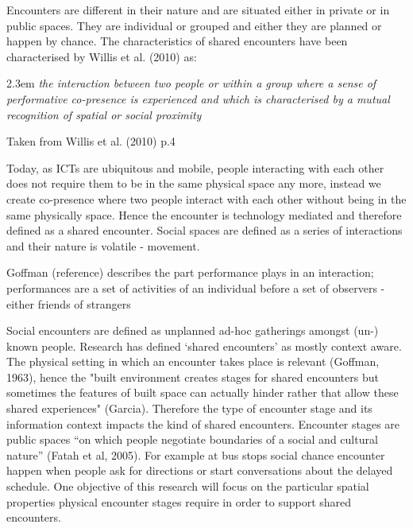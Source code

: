 Encounters are different in their nature and are situated either in private or in public spaces. They are individual or grouped and either they are planned or happen by chance. The characteristics of shared encounters have been characterised by Willis et al. (2010) as:


\begin{singlespace}
	\leftskip2.3em
		\rightskip\leftskip
\textit{\small the interaction between two people or within a group where a sense of performative co-presence is experienced and which is characterised by a mutual recognition of spatial or social proximity} 

\small Taken from  Willis et al. (2010) p.4
\end{singlespace}

Today, as ICTs are ubiquitous and mobile, people interacting with each other does not require them to be in the same physical space any more, instead we create co-presence where two people interact with each other without being in the same physically space. Hence the encounter is technology mediated and therefore defined as a shared encounter.
Social spaces are defined as a series of interactions and their nature is volatile - movement.

Goffman (reference) describes the part performance plays in an interaction; performances are a set of activities of an individual before a set of observers - either friends of strangers

Social encounters are defined as unplanned ad-hoc gatherings amongst (un-) known people. Research has defined ‘shared encounters’ as mostly context aware. The physical setting in which an encounter takes place is relevant (Goffman, 1963), hence the "built environment creates stages for shared encounters but sometimes the features of built space can actually hinder rather that allow these shared experiences" (Garcia). Therefore the type of encounter stage and its information context impacts the kind of shared encounters. Encounter stages are public spaces “on which people negotiate boundaries of a social and cultural nature” (Fatah et al, 2005). For example at bus stops social chance encounter happen when people ask for directions or start conversations about the delayed schedule. One objective of this research will focus on the particular spatial properties physical encounter stages require in order to support shared encounters.

